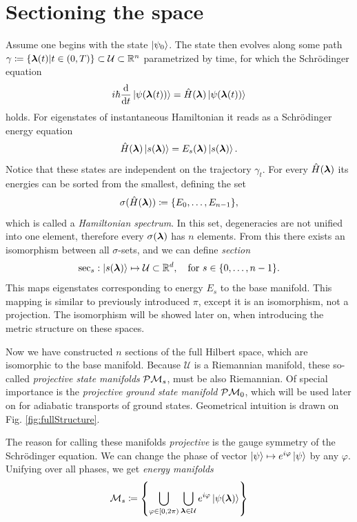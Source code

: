 \section{Sectioning the space}
Assume one begins with the state $\ket{\psi_0}$. The state then evolves along some path $\gamma\coloneqq\{{\bm\lambda}(t)|t\in(0,T)\}\subset \mathcal U \subset \mathbb{R}^n$ parametrized by time, for which the Schr\"odinger equation
\begin{equation}
    i\hbar \frac{\mathrm{d} }{\mathrm{d} t}\ket{\psi({\bm\lambda}(t))} = \hat{H}({\bm\lambda})\ket{\psi({\bm\lambda}(t))}
    \label{eq:schrodinger}
\end{equation}
holds. For eigenstates of instantaneous Hamiltonian it reads as a Schr\"odinger energy equation
\begin{equation}
    \hat{H}({\bm\lambda})\ket{s({\bm\lambda})}=E_s({\bm\lambda})\ket{s({\bm\lambda})}.
    \label{eq:energySchrodinger}
\end{equation}
Notice that these states are independent on the trajectory $\gamma_t$.
For every $\hat{H}({\bm\lambda})$ its energies can be sorted from the smallest, defining the set 
\begin{equation}
    \sigma(\hat{H}({\bm\lambda}))\coloneqq\{E_0,\dots,E_{n-1}\},
\end{equation}
which is called a \emph{Hamiltonian spectrum}. In this set, degeneracies are not unified into one element, therefore every $\sigma({\bm\lambda})$ has $n$ elements. From this there exists an isomorphism between all $\sigma$-sets, and we can define \emph{section} 
$$\mathrm{sec}_s: \ket{s({\bm\lambda})}\mapsto \mathcal{U}\subset \mathbb{R}^d, \quad \text{for } s\in\{0,\dots, n-1\}.$$
This maps eigenstates corresponding to energy $E_s$ to the base manifold. This mapping is similar to previously introduced $\pi$, except it is an isomorphism, not a projection. The isomorphism will be showed later on, when introducing the metric structure on these spaces.

Now we have constructed $n$ sections of the full Hilbert space, which are isomorphic to the base manifold. Because $\mathcal U$ is a Riemannian manifold, these so-called \emph{projective state manifolds} $\mathcal{P}\mathcal{M}_s$, must be also Riemannian.
Of special importance is the \emph{projective ground state manifold} $\mathcal{P}\mathcal{M}_0$, which will be used later on for adiabatic transports of ground states. Geometrical intuition is drawn on Fig. \ref{fig:fullStructure}. 

The reason for calling these manifolds \emph{projective} is the gauge symmetry of the Schr\"odinger equation. We can change the phase of vector $\ket{\psi}\mapsto e^{i\varphi}\ket{\psi}$ by any $\varphi$. Unifying over all phases, we get \emph{energy manifolds}
\begin{equation}
    \mathcal{M}_s\coloneqq \left\{\bigcup_{\varphi\in[0,2\pi)} \bigcup_{{\bm\lambda}\in\mathcal U} e^{i\varphi}\ket{\psi({\bm\lambda})}\right\}
\end{equation}

